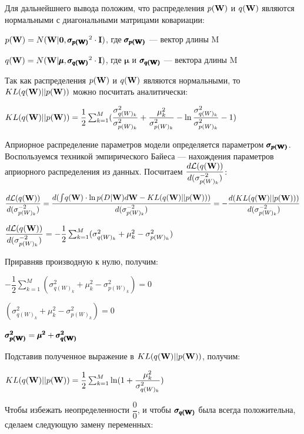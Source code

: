 \documentclass{article}
\begin{document}
Для дальнейшнего вывода положим, что распределения $p(\bold{W})$ и $q(\bold{W})$ являются нормальными с диагональными матрицами ковариации:

$p(\bold{W}) = N(\bold{W} | \bold{0}, \pmb{\sigma_{p(\bold{W})}}^{2} \cdot \bold{I})$, где $\pmb{\sigma_{p(\bold{W})}}$ — вектор длины M

$q(\bold{W}) = N(\bold{W} | \pmb{\mu}, \pmb{\sigma_{q(\bold{W})}}^{2} \cdot \bold{I})$, где $\pmb{\mu}$ и $\pmb{\sigma_{q(\bold{W})}}$ — вектора длины M

Так как распределения $p(\bold{W})$ и $q(\bold{W})$ являются нормальными, то $KL(q(\bold{W}) || p(\bold{W}))$ можно посчитать аналитически:

$
KL(q(\bold{W}) || p(\bold{W})) = 
\dfrac{1}{2}\sum_{k=1}^{M}(\dfrac{\sigma_{{q(W)_{k}}}^2}{\sigma_{{p(W)_{k}}}^2} + \dfrac{\mu_{k}^2}{\sigma_{{p(W)_{k}}}^2} - \ln{\dfrac{\sigma_{{q(W)_{k}}}^2}{\sigma_{{p(W)_{k}}}^2}} - 1)
$

Априорное распределение параметров модели определяется параметром $\pmb{\sigma_{p(\bold{W})}}$. Воспользуемся техникой эмпирического Байеса — нахождения параметров априорного распределения из данных. Посчитаем
$\dfrac{d\mathcal{L}(q(\bold{W}))}{d ({\sigma_{p(W)_{k}}^{-2}})}$:

$
\dfrac{d\mathcal{L}(q(\bold{W}))}{d ({\sigma_{p(W)_{k}}^{-2}})} =
\dfrac{d (\int_{}{} q(\bold{W}) \cdot \ln{p(D | \bold{W})} d\bold{W} - KL(q(\bold{W}) || p(\bold{W})))}{d ({\sigma_{p(W)_{k}}^{-2}})} =
- \dfrac{d (KL(q(\bold{W}) || p(\bold{W})))}{d ({\sigma_{p(W)_{k}}^{-2}})}$

$
\dfrac{d\mathcal{L}(q(\bold{W}))}{d ({\sigma_{p(W)_{k}}^{-2}})} =
-\dfrac{1}{2}\sum_{k=1}^{M}(\sigma_{{q(W)_{k}}}^2 + \mu_{k}^2 - \sigma_{{p(W)_{k}}}^2)
$

Приравняв производную к нулю, получим:

$
-\dfrac{1}{2}\sum_{k=1}^{M}(\sigma_{{q(W)_{k}}}^2 + \mu_{k}^2 - \sigma_{{p(W)_{k}}}^2) = 0
$

$
(\sigma_{{q(W)_{k}}}^2 + \mu_{k}^2 - \sigma_{{p(W)_{k}}}^2) = 0
$

$\pmb{\sigma_{p(\bold{W})}^{2}} = \pmb{\mu^{2}} + \pmb{\sigma_{q(\bold{W})}^{2}}$

Подставив полученное выражение в $KL(q(\bold{W}) || p(\bold{W}))$, получим:

$
KL(q(\bold{W}) || p(\bold{W})) = 
\dfrac{1}{2}\sum_{k=1}^{M}\ln({1 + \dfrac{\mu_{k}^2}{\sigma_{{q(W)_{k}}}^2}})
$

Чтобы избежать неопределенности $\dfrac{0}{0}$, и чтобы $\pmb{\sigma_{q(\bold{W})}}$ была всегда положительна, сделаем следующую замену переменных:
\end{document}
